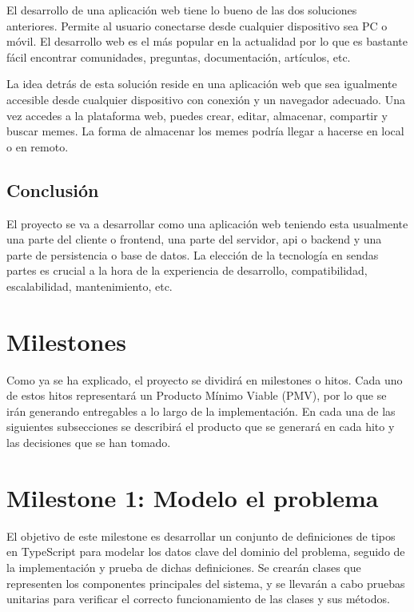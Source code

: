 El desarrollo de una aplicación web tiene lo bueno de las dos soluciones anteriores. Permite al usuario conectarse desde cualquier dispositivo sea PC o móvil. El desarrollo web es el más popular en la actualidad por lo que es bastante fácil encontrar comunidades, preguntas, documentación, artículos, etc.

La idea detrás de esta solución reside en una aplicación web que sea igualmente accesible desde cualquier dispositivo con conexión y un navegador adecuado. Una vez accedes a la plataforma web, puedes crear, editar, almacenar, compartir y buscar memes. La forma de almacenar los memes podría llegar a hacerse en local o en remoto.

\subsection{Conclusión}

El proyecto se va a desarrollar como una aplicación web teniendo esta usualmente una parte del cliente o frontend, una parte del servidor, api o backend y una parte de persistencia o base de datos. La elección de la tecnología en sendas partes es crucial a la hora de la experiencia de desarrollo, compatibilidad, escalabilidad, mantenimiento, etc.

\section{Milestones}

Como ya se ha explicado, el proyecto se dividirá en milestones o hitos. Cada uno de estos hitos representará un Producto Mínimo Viable (PMV), por lo que se irán generando entregables a lo largo de la implementación. En cada una de las siguientes subsecciones se describirá el producto que se generará en cada hito y las decisiones que se han tomado.

\section{Milestone 1: Modelo el problema}

El objetivo de este milestone es desarrollar un conjunto de definiciones de tipos en TypeScript para modelar los datos clave del dominio del problema, seguido de la implementación y prueba de dichas definiciones. Se crearán clases que representen los componentes principales del sistema, y se llevarán a cabo pruebas unitarias para verificar el correcto funcionamiento de las clases y sus métodos.

